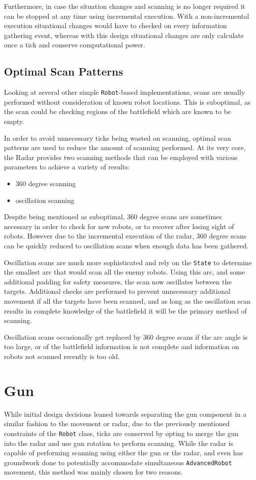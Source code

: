 \documentclass[11pt]{report}
\begin{document}
Furthermore, in case the situation changes and scanning is no longer required it can be stopped at any time using incremental execution. With a non-incremental execution situational changes would have to checked on every information gathering event, whereas with this design situational changes are only calculate once a tick and conserve computational power.

\subsection{Optimal Scan Patterns}
Looking at several other simple \texttt{Robot}-based implementations, scans are usually performed without consideration of known robot locations. This is suboptimal, as the scan could be checking regions of the battlefield which are known to be empty.

In order to avoid unnecessary ticks being wasted on scanning, optimal scan patterns are used to reduce the amount of scanning performed. At its very core, the Radar provides two scanning methods that can be employed with various parameters to achieve a variety of results:
\begin{itemize}
    \item 360 degree scanning
    \item oscillation scanning
\end{itemize}

Despite being mentioned as suboptimal, 360 degree scans are sometimes necessary in order to check for new robots, or to recover after losing sight of robots. However due to the incremental execution of the radar, 360 degree scans can be quickly reduced to oscillation scans when enough data has been gathered.

Oscillation scans are much more sophisticated and rely on the \texttt{State} to determine the smallest arc that would scan all the enemy robots. Using this arc, and some additional padding for safety measures, the scan now oscillates between the targets. Additional checks are performed to prevent unnecessary additional movement if all the targets have been scanned, and as long as the oscillation scan results in complete knowledge of the battlefield it will be the primary method of scanning.

Oscillation scans occasionally get replaced by 360 degree scans if the arc angle is too large, or of the battlefield information is not complete and information on robots not scanned recently is too old.

\section{Gun}
While initial design decisions leaned towards separating the gun component in a similar fashion to the movement or radar, due to the previously mentioned constraints of the \texttt{Robot} class, ticks are conserved by opting to merge the gun into the radar and use gun rotation to perform scanning. While the radar is capable of performing scanning using either the gun or the radar, and even has groundwork done to potentially accommodate simultaneous \texttt{AdvancedRobot} movement, this method was mainly chosen for two reasons.
\end{document}
